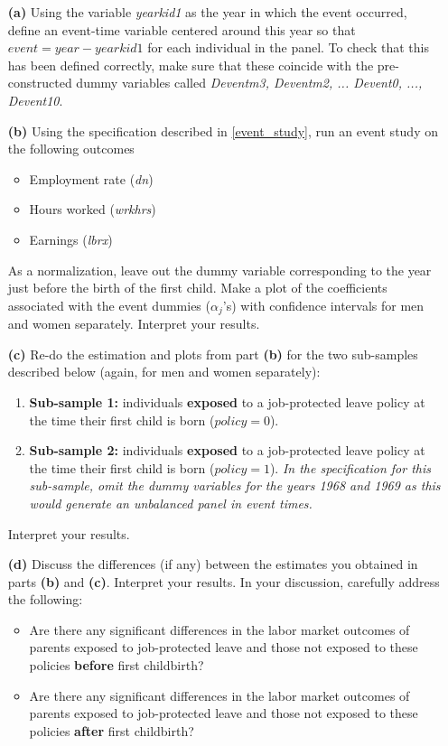 \documentclass[12pt]{article} %
\begin{document}
\begin{itemize}
	\item[\textbf{(a)}] Using the variable \textit{yearkid1} as the year in which the event occurred, define an event-time variable centered around this year so that $event = year - yearkid1$ for each individual in the panel. To check that this has been defined correctly, make sure that these coincide with the pre-constructed dummy variables called \textit{Deventm3, Deventm2, ... Devent0, ..., Devent10}.
	
	\item[\textbf{(b)}] Using the specification described in \ref{event_study}, run an event study on the following outcomes
\begin{itemize}
	\item Employment rate (\textit{dn})
	\item Hours worked (\textit{wrkhrs})
	\item Earnings (\textit{lbrx})
\end{itemize} As a normalization, leave out the dummy variable corresponding to the year just before the birth of the first child. Make a plot of the coefficients associated with the event dummies ($\alpha_j$'s) with confidence intervals for men and women separately. Interpret your results. 


\item[\textbf{(c)}] Re-do the estimation and plots from part \textbf{(b)} for the two sub-samples described below (again, for men and women separately):
\begin{enumerate}
    \item \textbf{Sub-sample 1:} individuals \textbf{exposed} to a job-protected leave policy at the time their first child is born (${policy}=0$).
    \item \textbf{Sub-sample 2:} individuals \textbf{exposed} to a job-protected leave policy at the time their first child is born (${policy}=1$). \textit{In the specification for this sub-sample, omit the dummy variables for the years 1968 and 1969 as this would generate an unbalanced panel in event times.}
\end{enumerate}
Interpret your results.

\item[\textbf{(d)}] Discuss the differences (if any) between the estimates you obtained in parts \textbf{(b)} and \textbf{(c)}. Interpret your results. In your discussion, carefully address the following:
\begin{itemize}
    \item Are there any significant differences in the labor market outcomes of parents exposed to job-protected leave and those not exposed to these policies \textbf{before} first childbirth?
    \item Are there any significant differences in the labor market outcomes of parents exposed to job-protected leave and those not exposed to these policies \textbf{after} first childbirth?
\end{itemize}
	
	
\end{itemize} 
\end{document}
